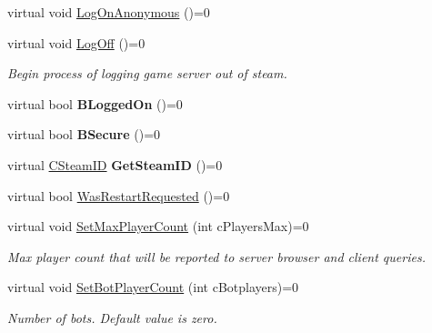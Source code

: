 \begin{DoxyCompactItemize}
\item 
virtual void \hyperlink{class_i_steam_game_server_ab54477676e6915f33d32b42e71ae63ab}{Log\+On\+Anonymous} ()=0
\item 
\mbox{\label{class_i_steam_game_server_acfbf4de28f5b30ae94ab4301d2e379e8}} 
virtual void \hyperlink{class_i_steam_game_server_acfbf4de28f5b30ae94ab4301d2e379e8}{Log\+Off} ()=0
\begin{DoxyCompactList}\small\item\em Begin process of logging game server out of steam. \end{DoxyCompactList}\item 
\mbox{\label{class_i_steam_game_server_a459f91ebd7ff6bf7d4fa71851ca58480}} 
virtual bool {\bfseries B\+Logged\+On} ()=0
\item 
\mbox{\label{class_i_steam_game_server_a508f92922dc12cdc7f6f71596ac1a8b0}} 
virtual bool {\bfseries B\+Secure} ()=0
\item 
\mbox{\label{class_i_steam_game_server_aabf710b337065b0d57cdb92844116106}} 
virtual \hyperlink{class_c_steam_i_d}{C\+Steam\+ID} {\bfseries Get\+Steam\+ID} ()=0
\item 
virtual bool \hyperlink{class_i_steam_game_server_a07da94c7bc216698683cd567cde93fb3}{Was\+Restart\+Requested} ()=0
\item 
\mbox{\label{class_i_steam_game_server_a52955851d455e48c9b464bae8ebd6143}} 
virtual void \hyperlink{class_i_steam_game_server_a52955851d455e48c9b464bae8ebd6143}{Set\+Max\+Player\+Count} (int c\+Players\+Max)=0
\begin{DoxyCompactList}\small\item\em Max player count that will be reported to server browser and client queries. \end{DoxyCompactList}\item 
\mbox{\label{class_i_steam_game_server_a0aeedc7ac0d018e43fd63df22ed824f5}} 
virtual void \hyperlink{class_i_steam_game_server_a0aeedc7ac0d018e43fd63df22ed824f5}{Set\+Bot\+Player\+Count} (int c\+Botplayers)=0
\begin{DoxyCompactList}\small\item\em Number of bots. Default value is zero. \end{DoxyCompactList}\item 

\end{DoxyCompactItemize}
